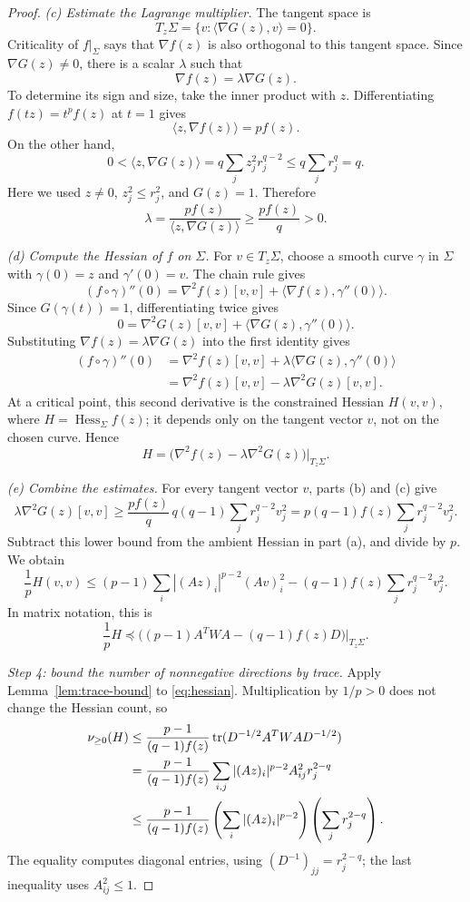 \documentclass[11pt]{article}
\theoremstyle{remark}
\DeclareMathOperator{\Hess}{Hess}
\DeclareMathOperator{\tr}{tr}
\newcommand{\nuplus}{\nu_{\geq 0}}
\begin{document}
\begin{proof}
\smallskip
\noindent\emph{(c) Estimate the Lagrange multiplier.}
The tangent space is
\[
 T_z\Sigma=\{v:\langle\nabla G(z),v\rangle=0\}.
\]
Criticality of $f|_\Sigma$ says that $\nabla f(z)$ is also
orthogonal to this tangent space. Since $\nabla G(z)\ne0$,
there is a scalar $\lambda$ such that
\[
 \nabla f(z)=\lambda\nabla G(z).
\]
To determine its sign and size, take the inner product with $z$.
Differentiating $f(tz)=t^pf(z)$ at $t=1$ gives
\[
 \langle z,\nabla f(z)\rangle=pf(z).
\]
On the other hand,
\[
 0<\langle z,\nabla G(z)\rangle
 =q\sum_jz_j^2r_j^{q-2}
 \leq q\sum_jr_j^q=q.
\]
Here we used $z\ne0$, $z_j^2\leq r_j^2$, and $G(z)=1$.
Therefore
\[
 \lambda=\frac{pf(z)}{\langle z,\nabla G(z)\rangle}
 \geq\frac{pf(z)}q>0.
\]

\smallskip
\noindent\emph{(d) Compute the Hessian of $f$ on $\Sigma$.}
For $v\in T_z\Sigma$, choose a smooth curve $\gamma$ in $\Sigma$
with $\gamma(0)=z$ and $\gamma'(0)=v$.
The chain rule gives
\[
 (f\circ\gamma)''(0)
 =\nabla^2f(z)[v,v]
  +\langle\nabla f(z),\gamma''(0)\rangle.
\]
Since $G(\gamma(t))=1$, differentiating twice gives
\[
 0=\nabla^2G(z)[v,v]
   +\langle\nabla G(z),\gamma''(0)\rangle.
\]
Substituting $\nabla f(z)=\lambda\nabla G(z)$ into the first
identity gives
\begin{align*}
 (f\circ\gamma)''(0)
 &=\nabla^2f(z)[v,v]
   +\lambda\langle\nabla G(z),\gamma''(0)\rangle\\
 &=\nabla^2f(z)[v,v]-\lambda\nabla^2G(z)[v,v].
\end{align*}
At a critical point, this second derivative is the constrained
Hessian $H(v,v)$, where $H=\Hess_\Sigma f(z)$; it depends only
on the tangent vector $v$, not on the chosen curve. Hence
\[
 H=\bigl(\nabla^2f(z)-\lambda\nabla^2G(z)\bigr)|_{T_z\Sigma}.
\]

\smallskip
\noindent\emph{(e) Combine the estimates.}
For every tangent vector $v$, parts (b) and (c) give
\[
 \lambda\nabla^2G(z)[v,v]
 \geq\frac{pf(z)}q\,q(q-1)\sum_jr_j^{q-2}v_j^2
 =p(q-1)f(z)\sum_jr_j^{q-2}v_j^2.
\]
Subtract this lower bound from the ambient Hessian in part (a),
and divide by $p$. We obtain
\[
 \frac1pH(v,v)
 \leq(p-1)\sum_i|(Az)_i|^{p-2}(Av)_i^2
      -(q-1)f(z)\sum_jr_j^{q-2}v_j^2.
\]
In matrix notation, this is
\begin{equation}\label{eq:hessian}
 \frac1p H\preceq
 \bigl((p-1)A^TWA-(q-1)f(z)D\bigr)|_{T_z\Sigma}.
\end{equation}

\smallskip
\noindent\emph{Step 4: bound the number of nonnegative directions by trace.}
Apply Lemma~\ref{lem:trace-bound} to \eqref{eq:hessian}.
Multiplication by $1/p>0$ does not change the Hessian count, so
\begin{align}
 \nuplus(H)
 &\leq\frac{p-1}{(q-1)f(z)}
       \tr(D^{-1/2}A^TWAD^{-1/2})\notag\\
 &=\frac{p-1}{(q-1)f(z)}
       \sum_{i,j}|(Az)_i|^{p-2}A_{ij}^2r_j^{2-q}\notag\\
 &\leq\frac{p-1}{(q-1)f(z)}
       \left(\sum_i|(Az)_i|^{p-2}\right)
       \left(\sum_jr_j^{2-q}\right).
 \label{eq:traceproduct}
\end{align}
The equality computes diagonal entries, using
$(D^{-1})_{jj}=r_j^{2-q}$; the last inequality uses $A_{ij}^2\leq1$.


\end{proof}
\end{document}
